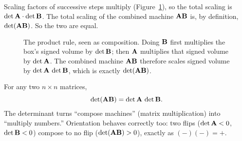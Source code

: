Scaling factors of successive steps multiply (Figure~\ref{ch21:fig-product}),
so the total scaling is $\det\mathbf{A}\cdot\det\mathbf{B}$. The total scaling of the
combined machine $\mathbf{A}\mathbf{B}$ is, by definition, $\det(\mathbf{A}\mathbf{B})$.
So the two are equal.

\begin{figure}[H]
\centering
{}
\caption{The product rule, seen as composition. Doing $\mathbf{B}$ first multiplies
the box's signed volume by $\det\mathbf{B}$; then $\mathbf{A}$ multiplies that signed volume by
$\det\mathbf{A}$. The combined machine $\mathbf{A}\mathbf{B}$ therefore scales signed volume by
$\det\mathbf{A}\,\det\mathbf{B}$, which is exactly $\det(\mathbf{A}\mathbf{B})$.}
\label{ch21:fig-product}
\end{figure}

\begin{formalbox}
For any two $n\times n$ matrices,
\[
  \det(\mathbf{A}\mathbf{B}) = \det\mathbf{A}\,\det\mathbf{B}.
\]
The determinant turns ``compose machines'' (matrix multiplication) into ``multiply
numbers.'' Orientation behaves correctly too: two flips ($\det\mathbf{A}<0$,
$\det\mathbf{B}<0$) compose to no flip ($\det(\mathbf{A}\mathbf{B})>0$), exactly as
$(-)(-)=+$.
\end{formalbox}

